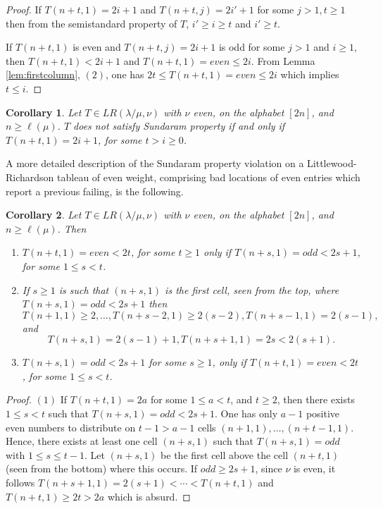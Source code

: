 \documentclass[reqno]{amsart}
\theoremstyle{tplain}
\newtheorem{cor}{Corollary}
\begin{document}
{\begin{proof}
 If $T(n+t,1)=2i+1$ and $T(n+t,j)=2i'+1$ for some $j>1, t\ge 1$ then from the semistandard property of $T$, $i'\ge i\ge t$ and $i'\ge t$.

 If $T(n+t,1)$ is even and $T(n+t,j)=2i+1$ is odd for some $j>1$ and $i\ge 1$, then $T(n+t,1)<2i+1$ and $T(n+t,1)=even\le 2i$.
 From Lemma \ref{lem:firstcolumn}, $(2)$, one has $2t\le T(n+t,1)=even\le 2i$ which implies $t\le i$.
 \end{proof}

\begin{cor} \label{neglrs} Let $T\in LR(\lambda/\mu,\nu)$ with $\nu$ even, on the alphabet $[2n]$, and $n\ge \ell(\mu)$. $T$ does not satisfy Sundaram property if and only if $T(n+t,1)=2i+1$, for some  $t> i\ge 0$.

\end{cor}

A more detailed description of the Sundaram property violation on a Littlewood-Richardson tableau of even weight, comprising bad locations of even entries which report a previous failing,  is the following.
\begin{cor} \label{cor:violation} Let $T\in LR(\lambda/\mu,\nu)$ with $\nu$ even, on the alphabet $[2n]$, and $n\ge \ell(\mu)$. Then
\begin{enumerate}
\item $T(n+t,1)=even< 2t$, for some $t\ge 1$  only if $T(n+s,1)=odd< 2s+1$, for some $1\le s<t$.

\item If $s\ge 1$ is such that $(n+s,1)$ is the first cell, seen from the top, where $T(n+s,1)=odd<2s+1$ then   $$T(n+1,1)\ge 2,\dots,T(n+s-2,1)\ge 2(s-2),  T(n+s-1,1)= 2(s-1),$$ 
    and $$T(n+s,1)=2(s-1)+1, T(n+s+1,1)=2s<2(s+1).$$

\item  $T(n+s,1)=odd< 2s+1$ for some $s\ge 1$, only if $T(n+t,1)=even< 2t$, for some  $1\le s<t$.
\end{enumerate}
\end{cor}
\begin{proof} $(1)$
If $T(n+t,1)=2a$ for some $1\le a<t$, and $t\ge 2$, then there exists $1\le s<t$ such that $T(n+s,1)=odd<2s+1$.
One has only $a-1$ positive even numbers to distribute on $t-1>a-1$ cells $(n+1,1),\dots,(n+t-1,1)$. Hence, there exists at least one cell $(n+s,1)$ such that $T(n+s,1)=odd$ with $1\le s\le t-1$. Let $(n+s,1)$ be the first cell above the cell $(n+t,1)$ (seen from the bottom) where this occurs.
If $odd\ge 2s+1$, since $\nu$ is even, it follows $T(n+s+1,1)=2(s+1)<\cdots<T(n+t,1)$ and $T(n+t,1)\ge 2t>2a$ which is absurd.


\end{proof}}
\end{document}
